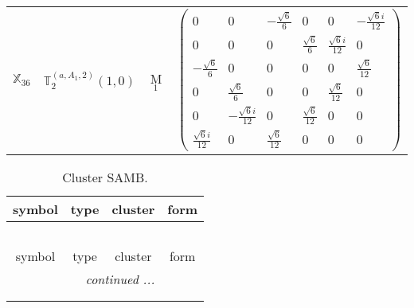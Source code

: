 \documentclass[fleqn,10pt,landscape]{article}
\begin{document}
\begin{itemize}
\begin{center}
\begin{longtable}{c|c|c|c}
$ \mathbb{X}_{36} $ & $\mathbb{T}_{2}^{(a,A_{1},2)}(1,0)$ & M$_{1}$ & $\begin{pmatrix} 0 & 0 & - \frac{\sqrt{6}}{6} & 0 & 0 & - \frac{\sqrt{6} i}{12} \\ 0 & 0 & 0 & \frac{\sqrt{6}}{6} & \frac{\sqrt{6} i}{12} & 0 \\ - \frac{\sqrt{6}}{6} & 0 & 0 & 0 & 0 & \frac{\sqrt{6}}{12} \\ 0 & \frac{\sqrt{6}}{6} & 0 & 0 & \frac{\sqrt{6}}{12} & 0 \\ 0 & - \frac{\sqrt{6} i}{12} & 0 & \frac{\sqrt{6}}{12} & 0 & 0 \\ \frac{\sqrt{6} i}{12} & 0 & \frac{\sqrt{6}}{12} & 0 & 0 & 0 \end{pmatrix}$ \\
\end{longtable}
\end{center}
\begin{center}
\renewcommand{\arraystretch}{1.3}
\begin{longtable}{c|c|c|c}
\caption{Cluster SAMB.}
 \\
 \hline \hline
symbol & type & cluster & form \\ \hline \endfirsthead

\multicolumn{3}{l}{\tablename\ \thetable{}} \\
 \hline \hline
symbol & type & cluster & form \\ \hline \endhead

 \hline \hline
\multicolumn{3}{r}{\footnotesize\it continued ...} \\ \endfoot

 \hline \hline
\multicolumn{3}{r}{} \\ \endlastfoot


\end{longtable}
\end{center}
\end{itemize}
\end{document}
